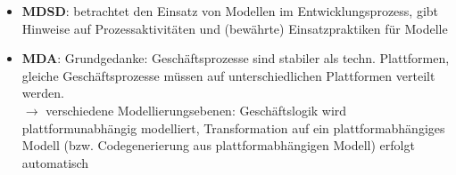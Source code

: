 \begin{itemize}
    \item \textbf{MDSD}: betrachtet den Einsatz von Modellen im Entwicklungsprozess, gibt Hinweise auf Prozessaktivitäten und (bewährte) Einsatzpraktiken für Modelle
    \item \textbf{MDA}: Grundgedanke: Geschäftsprozesse sind stabiler als {techn.} Plattformen, gleiche Geschäftsprozesse müssen auf unterschiedlichen Plattformen verteilt werden.\\
    $\rightarrow$ verschiedene Modellierungsebenen: Geschäftslogik wird plattformunabhängig modelliert, Transformation auf ein plattformabhängiges Modell (bzw. Codegenerierung aus plattformabhängigen Modell) erfolgt automatisch
\end{itemize}
